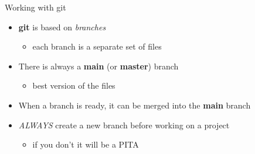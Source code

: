\documentclass[
  ignorenonframetext,
  aspectratio=169]{beamer}
\providecommand{\tightlist}{%
  \setlength{\itemsep}{0pt}\setlength{\parskip}{0pt}}
\begin{document}
\begin{frame}{Working with git}
\protect\hypertarget{working-with-git}{}
\begin{itemize}
\tightlist
\item
  \textbf{git} is based on \emph{branches}

  \begin{itemize}
  \tightlist
  \item
    each branch is a separate set of files
  \end{itemize}
\item
  There is always a \textbf{main} (or \textbf{master}) branch

  \begin{itemize}
  \tightlist
  \item
    best version of the files
  \end{itemize}
\item
  When a branch is ready, it can be merged into the \textbf{main} branch
\item
  \emph{ALWAYS} create a new branch before working on a project

  \begin{itemize}
  \tightlist
  \item
    if you don't it will be a PITA
  \end{itemize}
\end{itemize}
\end{frame}
\end{document}
